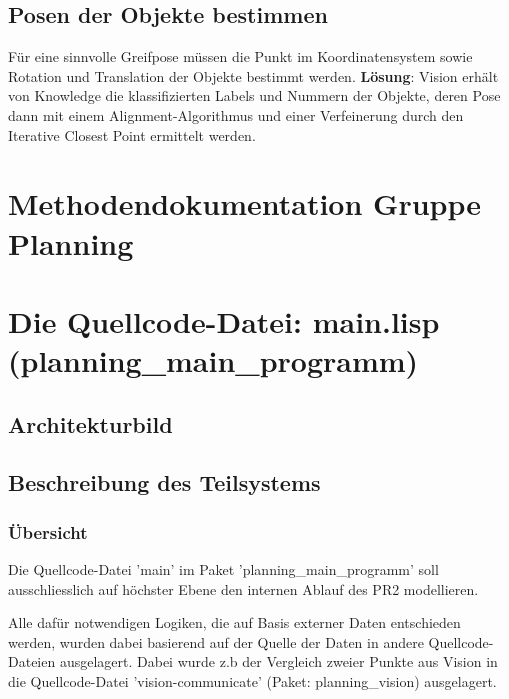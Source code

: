 \documentclass{suturo}
\begin{document}
\subsection{Posen der Objekte bestimmen}
Für eine sinnvolle Greifpose müssen die Punkt im Koordinatensystem sowie Rotation und Translation der Objekte bestimmt werden. 
\textbf{Lösung}: Vision erhält von Knowledge die klassifizierten Labels und Nummern der Objekte, deren Pose dann mit einem Alignment-Algorithmus und einer Verfeinerung durch den Iterative Closest Point ermittelt werden.

\section*{Methodendokumentation Gruppe Planning}
\section{Die Quellcode-Datei: main.lisp (planning\_main\_programm)}
\subsection{Architekturbild}


\begin{figure}[!htb]
\end{figure}



\subsection{Beschreibung des Teilsystems}
\subsubsection{\"Ubersicht}
Die Quellcode-Datei 'main' im Paket 'planning\_main\_programm' soll ausschliesslich auf höchster Ebene den internen Ablauf des PR2 modellieren. 

Alle dafür notwendigen Logiken, die auf Basis externer Daten entschieden werden, wurden dabei basierend auf der Quelle der Daten in andere Quellcode-Dateien ausgelagert. Dabei wurde z.b der Vergleich zweier Punkte aus Vision in die Quellcode-Datei 'vision-communicate' (Paket: planning\_vision) ausgelagert.
\end{document}
